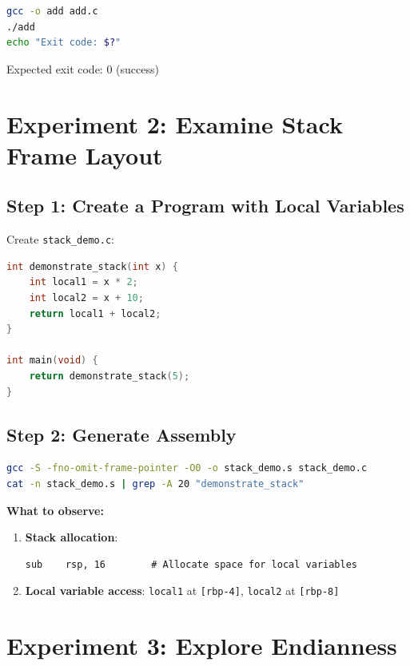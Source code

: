 \begin{lstlisting}[language=bash]
gcc -o add add.c
./add
echo "Exit code: $?"
\end{lstlisting}

Expected exit code: 0 (success)

\section{Experiment 2: Examine Stack Frame Layout}

\subsection{Step 1: Create a Program with Local Variables}

Create \texttt{stack\_demo.c}:

\begin{lstlisting}[language=C]
int demonstrate_stack(int x) {
    int local1 = x * 2;
    int local2 = x + 10;
    return local1 + local2;
}

int main(void) {
    return demonstrate_stack(5);
}
\end{lstlisting}

\subsection{Step 2: Generate Assembly}

\begin{lstlisting}[language=bash]
gcc -S -fno-omit-frame-pointer -O0 -o stack_demo.s stack_demo.c
cat -n stack_demo.s | grep -A 20 "demonstrate_stack"
\end{lstlisting}

\textbf{What to observe:}

\begin{enumerate}
\item \textbf{Stack allocation}:

\begin{lstlisting}
sub    rsp, 16        # Allocate space for local variables
\end{lstlisting}

\item \textbf{Local variable access}: \texttt{local1} at \texttt{[rbp-4]}, \texttt{local2} at \texttt{[rbp-8]}
\end{enumerate}

\section{Experiment 3: Explore Endianness}

